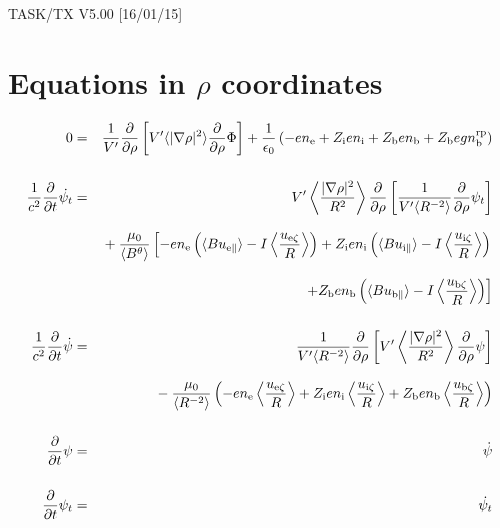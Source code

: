 \documentclass[11pt]{article}
\def\r#1{{\rm#1}}
\def\ave#1{\left\langle#1\right\rangle}
\def\aves#1{\langle#1\rangle}
\def\para{\parallel}
\def\ddrho{\frac{\partial}{\partial\rho}}
\def\gradrho2{\aves{|\nabla\rho|^2}}
\def\psid{\dot{\psi}}
\def\psit{\psi_t}
\def\psitd{\dot{\psit}}
\def\nee{n_\r{e}}
\def\ni{n_\r{i}}
\def\nb{n_\r{b}}
\def\Zi{Z_\r{i}}
\def\Zb{Z_\r{b}}
\def\uezt{u_{\r{e}\zeta}}
\def\uizt{u_{\r{i}\zeta}}
\def\ubzt{u_{\r{b}\zeta}}
\def\uepara{u_{\r{e}\para}}
\def\uipara{u_{\r{i}\para}}
\def\ubpara{u_{\r{b}\para}}
\def\ddt{\frac{\partial}{\partial t}}
\def\nbrp{n_\r{b}^\r{rp}}
\begin{document}
\begin{center}
TASK/TX V5.00 [16/01/15]
\end{center}

\section{Equations in $\rho$ coordinates}
\vspace{-5mm}

%
\begin{eqnarray}
  0 &=&
%
    \frac{1}{V'} \ddrho \left[ V' \gradrho2 \ddrho{\Phi} \right]
%
  + \frac{1}{\epsilon_0}
%
    \left(-e \nee + \Zi e \ni + \Zb e \nb + \Zb e g \nbrp \right)
\\[5mm]
  \frac{1}{c^2} \ddt \psitd &=&
%
    V' \ave{\frac{|\nabla\rho|^2}{R^2}} \ddrho \left[ \frac{1}{V'\aves{R^{-2}}}
				         \ddrho \psit \right] \nonumber\\[3mm]&&{}
%
  + \frac{\mu_0}{\aves{B^\theta}}
%
    \left[-     e \nee \left( \aves{B\uepara} - I\ave{\frac{\uezt}{R}} \right)
          + \Zi e \ni  \left( \aves{B\uipara} - I\ave{\frac{\uizt}{R}} \right)
    \right.\nonumber\\[3mm]&&{}
    \left.+ \Zb e \nb  \left( \aves{B\ubpara} - I\ave{\frac{\ubzt}{R}} \right) \right]
\\[5mm]
  \frac{1}{c^2} \ddt \psid &=&
%
  \frac{1}{V'\aves{R^{-2}}} \ddrho \left[ V'
				    \ave{\frac{|\nabla\rho|^2}{R^2}}
				    \ddrho \psi \right] \nonumber\\[3mm]&&{}
%
  - \frac{\mu_0}{\aves{R^{-2}}} \left(-e \nee \ave{\frac{\uezt}{R}} +
				 \Zi e \ni \ave{\frac{\uizt}{R}} + \Zb e
				 \nb \ave{\frac{\ubzt}{R}} \right)
%
\\[5mm]
  \ddt \psi &=&
%
  \psid
\\[5mm]
  \ddt \psit &=&
%
  \psitd
\end{eqnarray}
%

\end{document}
